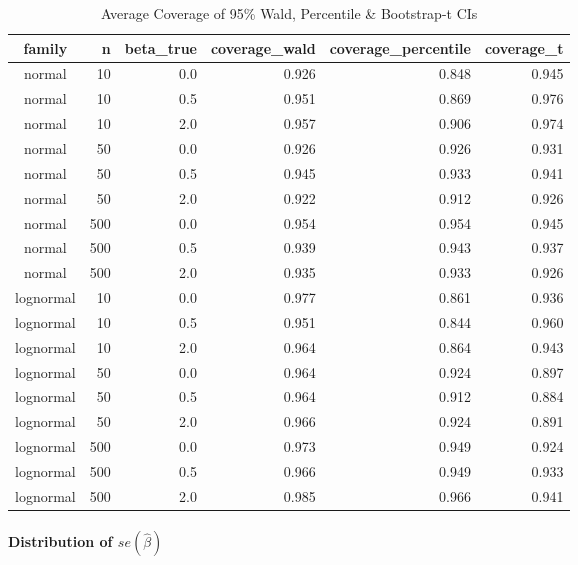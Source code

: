 \documentclass[
]{article}
\begin{document}
\begin{table}[!t]
\caption*{
{\large Average Coverage of 95\% Wald, Percentile \& Bootstrap-t CIs}
} 
\fontsize{12.0pt}{14.4pt}\selectfont
\begin{tabular*}{\linewidth}{@{\extracolsep{\fill}}crrrrr}
\toprule
family & n & beta\_true & coverage\_wald & coverage\_percentile & coverage\_t \\ 
\midrule\addlinespace[2.5pt]
normal & 10 & 0.0 & 0.926 & 0.848 & 0.945 \\ 
normal & 10 & 0.5 & 0.951 & 0.869 & 0.976 \\ 
normal & 10 & 2.0 & 0.957 & 0.906 & 0.974 \\ 
normal & 50 & 0.0 & 0.926 & 0.926 & 0.931 \\ 
normal & 50 & 0.5 & 0.945 & 0.933 & 0.941 \\ 
normal & 50 & 2.0 & 0.922 & 0.912 & 0.926 \\ 
normal & 500 & 0.0 & 0.954 & 0.954 & 0.945 \\ 
normal & 500 & 0.5 & 0.939 & 0.943 & 0.937 \\ 
normal & 500 & 2.0 & 0.935 & 0.933 & 0.926 \\ 
lognormal & 10 & 0.0 & 0.977 & 0.861 & 0.936 \\ 
lognormal & 10 & 0.5 & 0.951 & 0.844 & 0.960 \\ 
lognormal & 10 & 2.0 & 0.964 & 0.864 & 0.943 \\ 
lognormal & 50 & 0.0 & 0.964 & 0.924 & 0.897 \\ 
lognormal & 50 & 0.5 & 0.964 & 0.912 & 0.884 \\ 
lognormal & 50 & 2.0 & 0.966 & 0.924 & 0.891 \\ 
lognormal & 500 & 0.0 & 0.973 & 0.949 & 0.924 \\ 
lognormal & 500 & 0.5 & 0.966 & 0.949 & 0.933 \\ 
lognormal & 500 & 2.0 & 0.985 & 0.966 & 0.941 \\ 
\bottomrule
\end{tabular*}
\end{table}

\paragraph{\texorpdfstring{Distribution of
\(se(\hat{\beta})\)}{Distribution of se(\textbackslash hat\{\textbackslash beta\})}}\label{distribution-of-sehatbeta}
\end{document}
